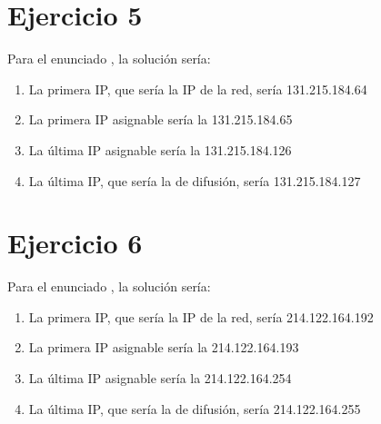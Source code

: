 \documentclass[letterpaper,10pt,spanish]{sphinxmanual}
\begin{document}
\section{Ejercicio 5}
\label{\detokenize{t2_integracion_elementos/ejercicios_subredes_ipv4/rangos_direcciones:id5}}
\sphinxAtStartPar
Para el enunciado , la solución sería:
\begin{enumerate}
%
\item {} 
\sphinxAtStartPar
La primera IP, que sería la IP de la red, sería 131.215.184.64

\item {} 
\sphinxAtStartPar
La primera IP asignable sería la 131.215.184.65

\item {} 
\sphinxAtStartPar
La última IP asignable sería la 131.215.184.126

\item {} 
\sphinxAtStartPar
La última IP, que sería la de difusión, sería 131.215.184.127

\end{enumerate}


\section{Ejercicio 6}
\label{\detokenize{t2_integracion_elementos/ejercicios_subredes_ipv4/rangos_direcciones:id6}}
\sphinxAtStartPar
Para el enunciado , la solución sería:
\begin{enumerate}
%
\item {} 
\sphinxAtStartPar
La primera IP, que sería la IP de la red, sería 214.122.164.192

\item {} 
\sphinxAtStartPar
La primera IP asignable sería la 214.122.164.193

\item {} 
\sphinxAtStartPar
La última IP asignable sería la 214.122.164.254

\item {} 
\sphinxAtStartPar
La última IP, que sería la de difusión, sería 214.122.164.255

\end{enumerate}
\end{document}
